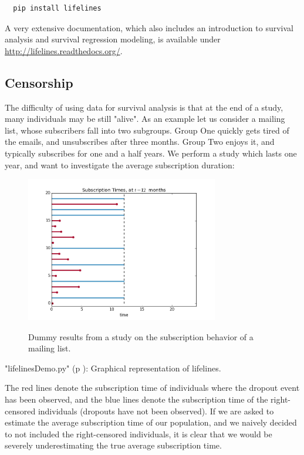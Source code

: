 \begin{lstlisting}
  pip install lifelines
\end{lstlisting}

 A very extensive documentation, which also includes an introduction to survival analysis and survival regression modeling, is available under \url{http://lifelines.readthedocs.org/}.

\subsection{Censorship}

The difficulty of using data for survival analysis is that at the end of a study, many individuals may be still "alive". As an example let us consider a mailing list, whose subscribers fall into two subgroups. Group One quickly gets tired of the emails, and unsubscribes after three months. Group Two enjoys it, and typically subscribes for one and a half years. We perform a study which lasts one year, and want to investigate the average subscription duration:

\begin{figure}[H]
  \centering
  \includegraphics[width=0.75\textwidth]{../Images/lifelines.png}\\
  \caption{Dummy results from a study on the subscription behavior of a mailing list.}\label{fig:lifelines}
\end{figure}

\PyImg "lifelinesDemo.py" (p \pageref{py:lifelines}): Graphical representation of lifelines.

The red lines denote the subscription time of individuals where the dropout event has been observed, and the blue lines denote the subscription time of the right-censored individuals (dropouts have not been observed). If we are asked to estimate the average subscription time of our population, and we naively decided to not included the right-censored individuals, it is clear that we would be severely underestimating the true average subscription time.

